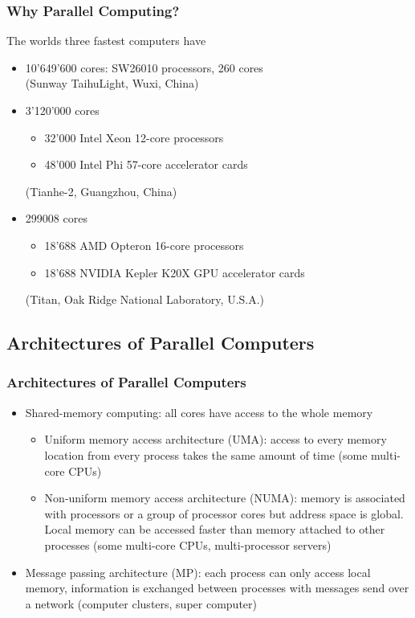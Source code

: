 \begin{frame}
\frametitle<presentation>{Why Parallel Computing?}

The worlds three fastest computers have 
\begin{itemize}
\item 10'649'600 cores: SW26010 processors, 260 cores\\
(Sunway TaihuLight, Wuxi, China)\\
\item 3'120'000 cores
\begin{itemize}
\item 32'000 Intel Xeon 12-core processors
\item 48'000 Intel Phi 57-core accelerator cards
\end{itemize}
(Tianhe-2, Guangzhou, China)\\
\item 299008 cores
\begin{itemize}
\item 18'688 AMD Opteron 16-core processors
\item 18'688 NVIDIA Kepler K20X GPU accelerator cards
\end{itemize}
(Titan, Oak Ridge National Laboratory, U.S.A.)
\end{itemize}

\end{frame}

\subsection{Architectures of Parallel Computers}

\begin{frame}
\frametitle<presentation>{Architectures of Parallel Computers}
\begin{itemize}
\item Shared-memory computing: all cores have access to the whole memory
\begin{itemize}
\item Uniform memory access architecture (UMA): access to every memory location from every process takes the
same amount of time (some multi-core CPUs)
\item Non-uniform memory access architecture (NUMA): memory is associated with processors or a group of processor cores but address space is
global. Local memory can be accessed faster than memory attached
to other processes (some multi-core CPUs, multi-processor servers)
\end{itemize}
\item Message passing architecture (MP): each process can only access local memory, information is exchanged
between processes with messages send over a network (computer clusters, super computer)
\end{itemize}
\end{frame}


